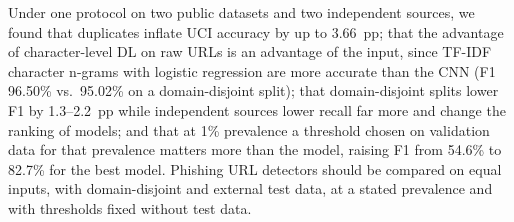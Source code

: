 \documentclass[conference]{IEEEtran}
\begin{document}
Under one protocol on two public datasets and two independent sources, we found that duplicates inflate UCI accuracy by up to 3.66~pp; that the advantage of character-level DL on raw URLs is an advantage of the input, since TF-IDF character n-grams with logistic regression are more accurate than the CNN (F1 96.50\% vs.\ 95.02\% on a domain-disjoint split); that domain-disjoint splits lower F1 by 1.3--2.2~pp while independent sources lower recall far more and change the ranking of models; and that at 1\% prevalence a threshold chosen on validation data for that prevalence matters more than the model, raising F1 from 54.6\% to 82.7\% for the best model. Phishing URL detectors should be compared on equal inputs, with domain-disjoint and external test data, at a stated prevalence and with thresholds fixed without test data.
\end{document}
